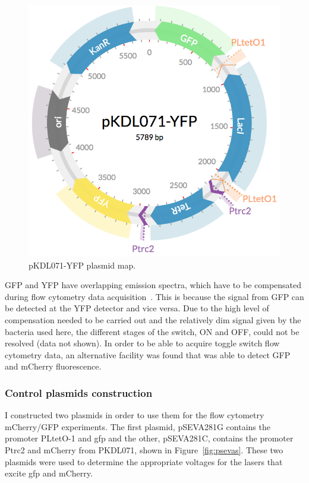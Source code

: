 \begin{figure}[tb]
	\begin{center}
		\includegraphics[scale=0.3]{../../chapters/chapterABCFlow/images/pKDL071-YFP.png}
		\caption[pKDL071-YFP plasmid map ]{\label{fig:pkdl071yfp} pKDL071-YFP plasmid map.  }
	\end{center}
\end{figure}

GFP and YFP have overlapping emission spectra, which have to be compensated during flow cytometry data acquisition~\autocite{Shapiro:1941}. This is because the signal from GFP can be detected at the YFP detector and vice versa. Due to the high level of compensation needed to be carried out and the relatively dim signal given by the bacteria used here, the different stages of the switch, ON and OFF, could not be resolved (data not shown). In order to be able to acquire toggle switch flow cytometry data, an alternative facility was found that was able to detect GFP and mCherry fluorescence. 

\subsubsection{Control plasmids construction}
I constructed two plasmids in order to use them for the flow cytometry mCherry/GFP experiments. The first plasmid, pSEVA281G contains the promoter PLtetO-1 and \acrshort{gfp} and the other, pSEVA281C, contains the promoter Ptrc2 and mCherry from PKDL071, shown in Figure~\ref{fig:psevas}. These two plasmids were used to determine the appropriate voltages for the lasers that excite \acrshort{gfp} and mCherry.

